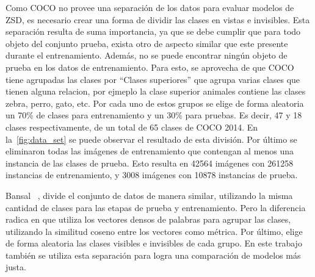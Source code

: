 Como COCO no provee una separación de los datos para evaluar modelos de ZSD, es necesario crear una forma de dividir las clases en vistas e invisibles. Esta separación resulta de suma importancia, ya que se debe cumplir que para todo objeto del conjunto prueba, exista otro de aspecto similar que este presente durante el entrenamiento. Además, no se puede encontrar ningún objeto de prueba en los datos de entrenamiento. Para esto, se aprovecha de que COCO tiene agrupadas las clases por ``Clases superiores'' que agrupa varias clases que tienen alguna relacion, por ejmeplo la clase superior animales contiene las clases zebra, perro, gato, etc. Por cada uno de estos grupos se elige de forma aleatoria un 70\% de clases para entrenamiento y un 30\% para pruebas. Es decir, 47 y 18 clases respectivamente, de un total de 65 clases de COCO 2014. En la~\autoref{fig:data_set} se puede observar el resultado de esta división. Por último se eliminaron todas las imágenes de entrenamiento que contengan al menos una instancia de las clases de prueba. Esto resulta en 42564 imágenes con 261258 instancias de entrenamiento, y 3008 imágenes con 10878 instancias de prueba. 

Bansal \etal~\cite{bansal2018zero}, divide el conjunto de datos de manera similar, utilizando la misma cantidad de clases para las etapas de prueba y entrenamiento. Pero la diferencia radica en que utiliza los vectores densos de palabras para agrupar las clases, utilizando la  similitud coseno entre los vectores como métrica. Por último, elige de forma aleatoria las clases visibles e invisibles de cada grupo. En este trabajo también se utiliza esta separación para logra una comparación de modelos más justa.


